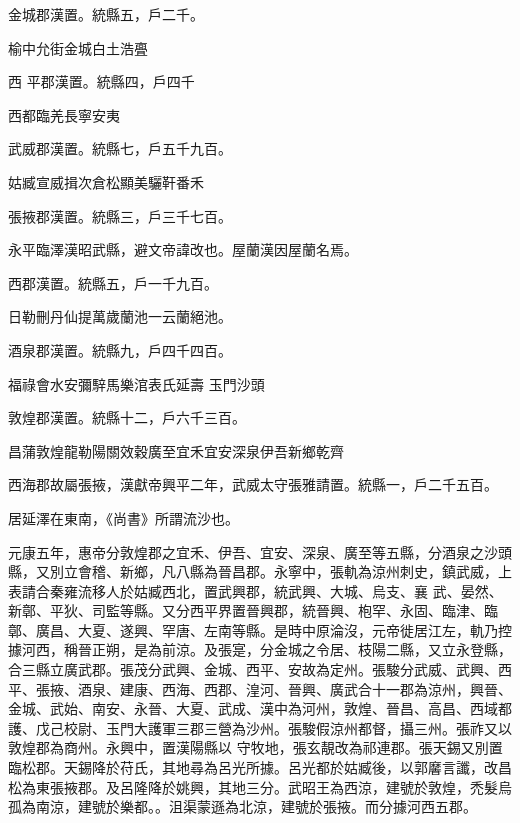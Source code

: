 \begin{pinyinscope}
 金城郡漢置。統縣五，戶二千。



 榆中允街金城白土浩亹



 西
 平郡漢置。統縣四，戶四千



 西都臨羌長寧安夷



 武威郡漢置。統縣七，戶五千九百。



 姑臧宣威揖次倉松顯美驪靬番禾



 張掖郡漢置。統縣三，戶三千七百。



 永平臨澤漢昭武縣，避文帝諱改也。屋蘭漢因屋蘭名焉。



 西郡漢置。統縣五，戶一千九百。



 日勒刪丹仙提萬歲蘭池一云蘭絕池。



 酒泉郡漢置。統縣九，戶四千四百。



 福祿會水安彌騂馬樂涫表氏延壽
 玉門沙頭



 敦煌郡漢置。統縣十二，戶六千三百。



 昌蒲敦煌龍勒陽關效穀廣至宜禾宜安深泉伊吾新鄉乾齊



 西海郡故屬張掖，漢獻帝興平二年，武威太守張雅請置。統縣一，戶二千五百。



 居延澤在東南，《尚書》所謂流沙也。



 元康五年，惠帝分敦煌郡之宜禾、伊吾、宜安、深泉、廣至等五縣，分酒泉之沙頭縣，又別立會稽、新鄉，凡八縣為晉昌郡。永寧中，張軌為涼州刺史，鎮武威，上表請合秦雍流移人於姑臧西北，置武興郡，統武興、大城、烏支、襄
 武、晏然、新鄣、平狄、司監等縣。又分西平界置晉興郡，統晉興、枹罕、永固、臨津、臨鄣、廣昌、大夏、遂興、罕唐、左南等縣。是時中原淪沒，元帝徙居江左，軌乃控據河西，稱晉正朔，是為前涼。及張寔，分金城之令居、枝陽二縣，又立永登縣，合三縣立廣武郡。張茂分武興、金城、西平、安故為定州。張駿分武威、武興、西平、張掖、酒泉、建康、西海、西郡、湟河、晉興、廣武合十一郡為涼州，興晉、金城、武始、南安、永晉、大夏、武成、漢中為河州，敦煌、晉昌、高昌、西域都護、戊己校尉、玉門大護軍三郡三營為沙州。張駿假涼州都督，攝三州。張祚又以敦煌郡為商州。永興中，置漢陽縣以
 守牧地，張玄靚改為祁連郡。張天錫又別置臨松郡。天錫降於苻氏，其地尋為呂光所據。呂光都於姑臧後，以郭黁言讖，改昌松為東張掖郡。及呂隆降於姚興，其地三分。武昭王為西涼，建號於敦煌，禿髮烏孤為南涼，建號於樂都。。沮渠蒙遜為北涼，建號於張掖。而分據河西五郡。




\end{pinyinscope}
